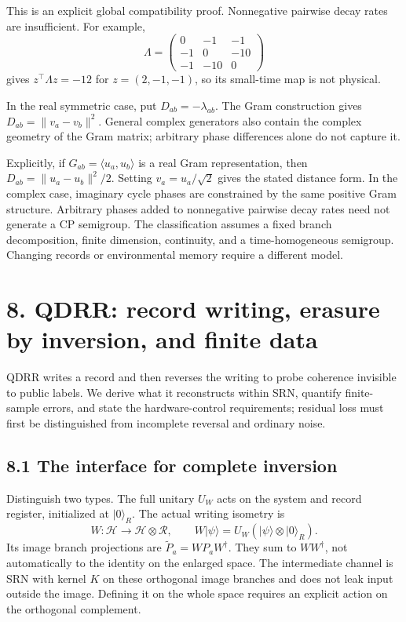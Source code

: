 \documentclass[
  11pt,
  oneside]{book}
\begin{document}
This is an explicit global compatibility proof. Nonnegative pairwise
decay rates are insufficient. For example, \[
\Lambda=\begin{pmatrix}0&-1&-1\\-1&0&-10\\-1&-10&0\end{pmatrix}
\] gives \(z^\top\Lambda z=-12\) for \(z=(2,-1,-1)\), so its small-time
map is not physical.

In the real symmetric case, put \(D_{ab}=-\lambda_{ab}\). The Gram
construction gives \(D_{ab}=\|v_a-v_b\|^2\). General complex generators
also contain the complex geometry of the Gram matrix; arbitrary phase
differences alone do not capture it.

Explicitly, if \(G_{ab}=\langle u_a,u_b\rangle\) is a real Gram
representation, then \(D_{ab}=\|u_a-u_b\|^2/2\). Setting
\(v_a=u_a/\sqrt2\) gives the stated distance form. In the complex case,
imaginary cycle phases are constrained by the same positive Gram
structure. Arbitrary phases added to nonnegative pairwise decay rates
need not generate a CP semigroup. The classification assumes a fixed
branch decomposition, finite dimension, continuity, and a
time-homogeneous semigroup. Changing records or environmental memory
require a different model.

\chapter{8. QDRR: record writing, erasure by inversion, and finite
data}\label{ch-8}

QDRR writes a record and then reverses the writing to probe coherence
invisible to public labels. We derive what it reconstructs within SRN,
quantify finite-sample errors, and state the hardware-control
requirements; residual loss must first be distinguished from incomplete
reversal and ordinary noise.

\section{8.1 The interface for complete inversion}

Distinguish two types. The full unitary \(U_W\) acts on the system and
record register, initialized at \(|0\rangle_R\). The actual writing
isometry is \[
W:\mathcal H\to\mathcal H\otimes\mathcal R,\qquad
W|\psi\rangle=U_W(|\psi\rangle\otimes|0\rangle_R).
\] Its image branch projections are \(\widetilde P_a=WP_aW^\dagger\).
They sum to \(WW^\dagger\), not automatically to the identity on the
enlarged space. The intermediate channel is SRN with kernel \(K\) on
these orthogonal image branches and does not leak input outside the
image. Defining it on the whole space requires an explicit action on the
orthogonal complement.
\end{document}
